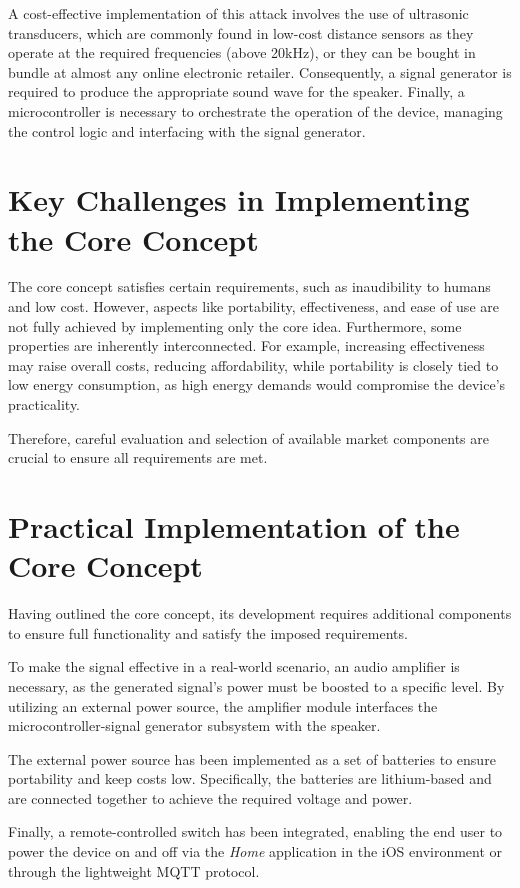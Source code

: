 A cost-effective implementation of this attack involves the use of ultrasonic transducers, which are commonly found in low-cost distance sensors as they operate at the required frequencies (above 20kHz), or they can be bought in bundle at almost any online electronic retailer.
Consequently, a signal generator is required to produce the appropriate sound wave for the speaker. 
Finally, a microcontroller is necessary to orchestrate the operation of the device, managing the control logic and interfacing with the signal generator. 

\section{Key Challenges in Implementing the Core Concept}
The core concept satisfies certain requirements, such as inaudibility to humans and low cost. 
However, aspects like portability, effectiveness, and ease of use are not fully achieved by implementing only the core idea. 
Furthermore, some properties are inherently interconnected. 
For example, increasing effectiveness may raise overall costs, reducing affordability, while portability is closely tied to low energy consumption, as high energy demands would compromise the device's practicality.

Therefore, careful evaluation and selection of available market components are crucial to ensure all requirements are met.

\section{Practical Implementation of the Core Concept}
Having outlined the core concept, its development requires additional components to ensure full functionality and satisfy the imposed requirements. 

To make the signal effective in a real-world scenario, an audio amplifier is necessary, as the generated signal's power must be boosted to a specific level.
By utilizing an external power source, the amplifier module interfaces the microcontroller-signal generator subsystem with the speaker.

The external power source has been implemented as a set of batteries to ensure portability and keep costs low.
Specifically, the batteries are lithium-based and are connected together to achieve the required voltage and power.

Finally, a remote-controlled switch has been integrated, enabling the end user to power the device on and off via the \textit{Home} application in the iOS environment or through the lightweight MQTT protocol.